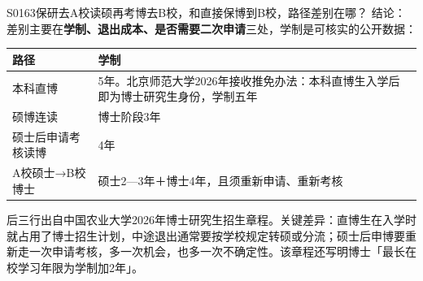 \begin{qa}{S0163}{保研去A校读硕再考博去B校，和直接保博到B校，路径差别在哪？}
结论：差别主要在\textbf{学制、退出成本、是否需要二次申请}三处，学制是可核实的公开数据：

\par\vspace{2pt}\nobreak\begin{center}\footnotesize
\begin{tabularx}{\textwidth}{>{\raggedright\arraybackslash}X>{\raggedright\arraybackslash}X}
\toprule
\textbf{路径} & \textbf{学制} \\ \midrule
本科直博 & 5年。北京师范大学2026年接收推免办法：本科直博生入学后即为博士研究生身份，学制五年 \\
硕博连读 & 博士阶段3年 \\
硕士后申请考核读博 & 4年 \\
A校硕士→B校博士 & 硕士2—3年＋博士4年，且须重新申请、重新考核 \\
\bottomrule
\end{tabularx}
\end{center}\vspace{2pt}\par

后三行出自中国农业大学2026年博士研究生招生章程。关键差异：直博生在入学时就占用了博士招生计划，中途退出通常要按学校规定转硕或分流；硕士后申博要重新走一次申请考核，多一次机会，也多一次不确定性。该章程还写明博士「最长在校学习年限为学制加2年」。
\end{qa}

